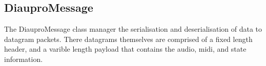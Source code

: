 \subsection{DiauproMessage}

The DiauproMessage class manager the serialisation and deserialisation of data to datagram packets. There datagrams themselves are comprised of a fixed length header, and a varible length payload that contains the audio, midi, and state information.